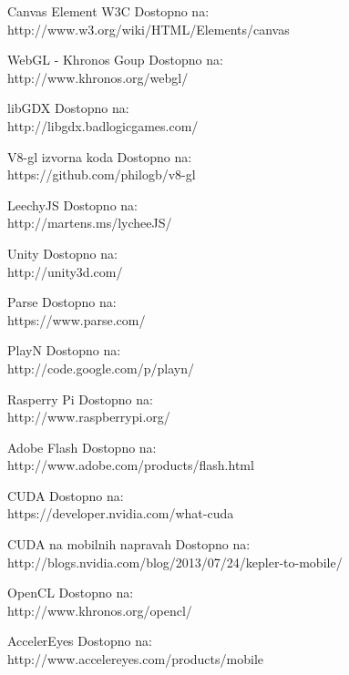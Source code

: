 \begin{thebibliography}{1}

 Canvas Element W3C 
Dostopno na:\\ http://www.w3.org/wiki/HTML/Elements/canvas

 WebGL - Khronos Goup 
Dostopno na:\\ http://www.khronos.org/webgl/

 libGDX 
Dostopno na:\\ http://libgdx.badlogicgames.com/

 V8-gl izvorna koda 
Dostopno na:\\ https://github.com/philogb/v8-gl

 LeechyJS 
Dostopno na:\\ http://martens.ms/lycheeJS/

 Unity 
Dostopno na:\\ http://unity3d.com/

 Parse 
Dostopno na:\\ https://www.parse.com/

 PlayN 
Dostopno na:\\ http://code.google.com/p/playn/

 Rasperry Pi 
Dostopno na:\\ http://www.raspberrypi.org/

 Adobe Flash
Dostopno na:\\ http://www.adobe.com/products/flash.html


 CUDA
Dostopno na:\\ https://developer.nvidia.com/what-cuda

 CUDA na mobilnih napravah
Dostopno na:\\ http://blogs.nvidia.com/blog/2013/07/24/kepler-to-mobile/

 OpenCL
Dostopno na:\\ http://www.khronos.org/opencl/

 AccelerEyes
Dostopno na:\\ http://www.accelereyes.com/products/mobile

\end{thebibliography}


